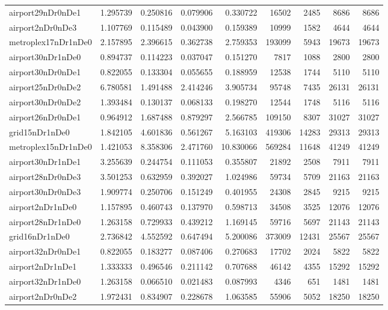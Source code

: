 \begin{longtable}{|l|r|r|r|r|r|r|r|r|}
airport29nDr0nDe1 & 1.295739 & 0.250816 & 0.079906 & 0.330722 & 16502 & 2485 & 8686 & 8686 \\
airport2nDr0nDe3 & 1.107769 & 0.115489 & 0.043900 & 0.159389 & 10999 & 1582 & 4644 & 4644 \\
metroplex17nDr1nDe0 & 2.157895 & 2.396615 & 0.362738 & 2.759353 & 193099 & 5943 & 19673 & 19673 \\
airport30nDr1nDe0 & 0.894737 & 0.114223 & 0.037047 & 0.151270 & 7817 & 1088 & 2800 & 2800 \\
airport30nDr0nDe1 & 0.822055 & 0.133304 & 0.055655 & 0.188959 & 12538 & 1744 & 5110 & 5110 \\
airport25nDr0nDe2 & 6.780581 & 1.491488 & 2.414246 & 3.905734 & 95748 & 7435 & 26131 & 26131 \\
airport30nDr0nDe2 & 1.393484 & 0.130137 & 0.068133 & 0.198270 & 12544 & 1748 & 5116 & 5116 \\
airport26nDr0nDe1 & 0.964912 & 1.687488 & 0.879297 & 2.566785 & 109150 & 8307 & 31027 & 31027 \\
grid15nDr1nDe0 & 1.842105 & 4.601836 & 0.561267 & 5.163103 & 419306 & 14283 & 29313 & 29313 \\
metroplex15nDr1nDe0 & 1.421053 & 8.358306 & 2.471760 & 10.830066 & 569284 & 11648 & 41249 & 41249 \\
airport30nDr1nDe1 & 3.255639 & 0.244754 & 0.111053 & 0.355807 & 21892 & 2508 & 7911 & 7911 \\
airport28nDr0nDe3 & 3.501253 & 0.632959 & 0.392027 & 1.024986 & 59734 & 5709 & 21163 & 21163 \\
airport30nDr0nDe3 & 1.909774 & 0.250706 & 0.151249 & 0.401955 & 24308 & 2845 & 9215 & 9215 \\
airport2nDr1nDe0 & 1.157895 & 0.460743 & 0.137970 & 0.598713 & 34508 & 3525 & 12076 & 12076 \\
airport28nDr1nDe0 & 1.263158 & 0.729933 & 0.439212 & 1.169145 & 59716 & 5697 & 21143 & 21143 \\
grid16nDr1nDe0 & 2.736842 & 4.552592 & 0.647494 & 5.200086 & 373009 & 12431 & 25567 & 25567 \\
airport32nDr0nDe1 & 0.822055 & 0.183277 & 0.087406 & 0.270683 & 17702 & 2024 & 5822 & 5822 \\
airport2nDr1nDe1 & 1.333333 & 0.496546 & 0.211142 & 0.707688 & 46142 & 4355 & 15292 & 15292 \\
airport32nDr1nDe0 & 1.263158 & 0.066510 & 0.021483 & 0.087993 & 4346 & 651 & 1481 & 1481 \\
airport2nDr0nDe2 & 1.972431 & 0.834907 & 0.228678 & 1.063585 & 55906 & 5052 & 18250 & 18250 \\

\end{longtable}
